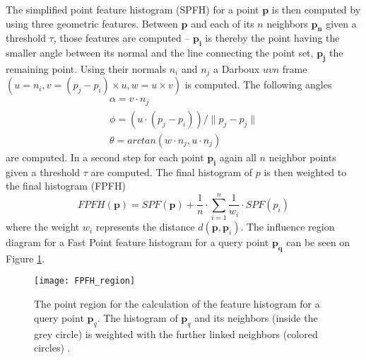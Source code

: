 The simplified point feature histogram (SPFH) for a point $\boldsymbol{p}$ is then computed by using three geometric features. Between $\boldsymbol{p}$ and each of its $n$ neighbors $\boldsymbol{p_n}$ given a threshold $\tau$, those features are computed -- $\boldsymbol{p_i}$ is thereby the point having the smaller angle between its normal and the line connecting the point set, $\boldsymbol{p_j}$ the remaining point. Using their normals $n_i$ and $n_j$ a Darboux $uvn$ frame $(u = n_i, v = (p_j - p_i) \times u, w = u \times v)$ is computed. The following angles
\begin{equation}
\begin{split}
\alpha = v \cdot n_j
\\
\phi = (u \cdot (p_j - p_i))/\|p_j - p_j\|
\\
\theta = arctan(w \cdot n_j, u \cdot n_j)
\end{split}
\label{eq:AngularVariations}
\end{equation}
are computed. In a second step for each point $\boldsymbol{p_i}$ again all $n$ neighbor points given a threshold $\tau$ are computed. The final histogram of $p$ is then weighted to the final histogram (FPFH)
\begin{equation}
FPFH(\boldsymbol{p}) = SPF(\boldsymbol{p}) + \frac{1}{n} \cdot \displaystyle\sum_{i=1}^{n}\frac{1}{w_i} \cdot SPF(p_i)
\end{equation}
where the weight $w_i$ represents the distance $d(\boldsymbol{p},\boldsymbol{p}_i)$. The influence region diagram for a Fast Point feature histogram for a query point $\boldsymbol{p_q}$ can be seen on Figure \ref{fig:FPFHregion}. 
\begin{figure}[H]
	\centering
	\texttt{[image: FPFH\_region]}
	\caption{The point region for the calculation of the feature histogram for a query point $\boldsymbol{p}_q$. The histogram of $\boldsymbol{p}_q$ and its neighbors (inside the grey circle) is weighted with the further linked neighbors (colored circles) \cite{FPFH}.}
	\label{fig:FPFHregion}
\end{figure}


